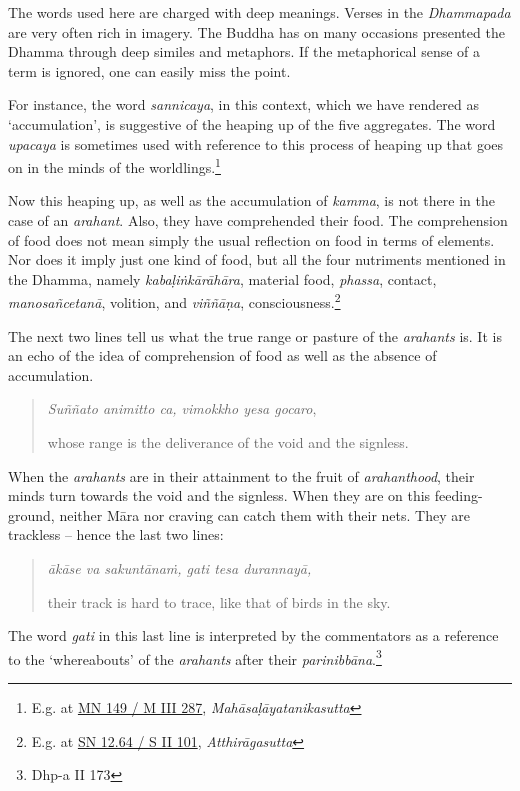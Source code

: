The words used here are charged with deep meanings. Verses in the \emph{Dhammapada} are very often rich in imagery. The Buddha has on many occasions presented the Dhamma through deep similes and metaphors. If the metaphorical sense of a term is ignored, one can easily miss the point.

For instance, the word \emph{sannicaya}, in this context, which we have rendered as `accumulation', is suggestive of the heaping up of the five aggregates. The word \emph{upacaya} is sometimes used with reference to this process of heaping up that goes on in the minds of the worldlings.\footnote{E.g. at \href{https://suttacentral.net/mn149/pli/ms}{MN 149 / M III 287}, \emph{Mahāsaḷāyatanikasutta}}

Now this heaping up, as well as the accumulation of \emph{kamma}, is not there in the case of an \emph{arahant}. Also, they have comprehended their food. The comprehension of food does not mean simply the usual reflection on food in terms of elements. Nor does it imply just one kind of food, but all the four nutriments mentioned in the Dhamma, namely \emph{kabaḷiṅkārāhāra}, material food, \emph{phassa}, contact, \emph{manosañcetanā}, volition, and \emph{viññāṇa}, consciousness.\footnote{E.g. at \href{https://suttacentral.net/sn12.64/pli/ms}{SN 12.64 / S II 101}, \emph{Atthirāgasutta}}

The next two lines tell us what the true range or pasture of the \emph{arahants} is. It is an echo of the idea of comprehension of food as well as the absence of accumulation.

\begin{quote}
\emph{Suññato animitto ca, vimokkho yesa gocaro},

whose range is the deliverance of the void and the signless.
\end{quote}

When the \emph{arahants} are in their attainment to the fruit of \emph{arahanthood}, their minds turn towards the void and the signless. When they are on this feeding-ground, neither Māra nor craving can catch them with their nets. They are trackless -- hence the last two lines:

\begin{quote}
\emph{ākāse va sakuntānaṁ, gati tesa durannayā,}

their track is hard to trace, like that of birds in the sky.
\end{quote}

The word \emph{gati} in this last line is interpreted by the commentators as a reference to the `whereabouts' of the \emph{arahants} after their \emph{parinibbāna}.\footnote{Dhp-a II 173}

